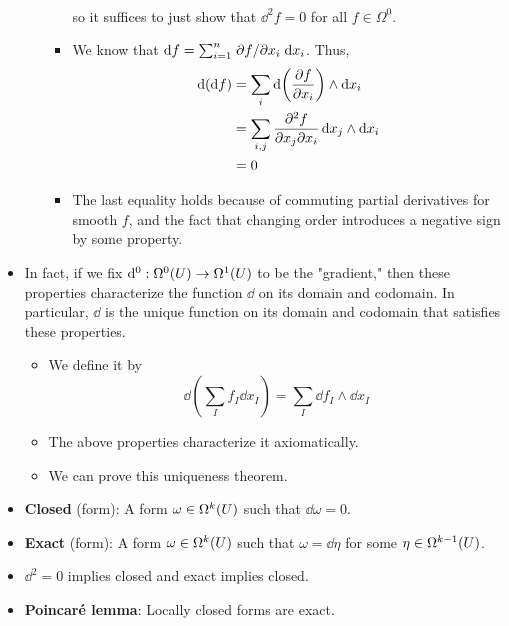 \documentclass[../notes.tex]{subfiles}
\begin{document}
\begin{itemize}
\begin{enumerate}
\begin{itemize}
\begin{align*}
            \end{align*}
            so it suffices to just show that $\dd^2f=0$ for all $f\in\Omega^0$.
            \item We know that $\dd{f}=\sum_{i=1}^n\pdv*{f}{x_i}\dd{x_i}$. Thus,
            \begin{align*}
                \dd(\dd{f}) &= \sum_i\dd(\pdv{f}{x_i})\wedge\dd{x_i}\\
                &= \sum_{i,j}\pdv{f}{x_j}{x_i}\dd{x_j}\wedge\dd{x_i}\\
                &= 0
            \end{align*}
            \item The last equality holds because of commuting partial derivatives for smooth $f$, and the fact that changing order introduces a negative sign by some property.
        \end{itemize}
    \end{enumerate}
    \item In fact, if we fix $\dd^0:\ome[0]{U}\to\ome[1]{U}$ to be the "gradient," then these properties characterize the function $\dd$ on its domain and codomain. In particular, $\dd$ is the unique function on its domain and codomain that satisfies these properties.
    \begin{itemize}
        \item We define it by
        \begin{equation*}
            \dd{\left( \sum_If_I\dd{x_I} \right)} = \sum_I\dd{f_I}\wedge\dd{x_I}
        \end{equation*}
        \item The above properties characterize it axiomatically.
        \item We can prove this uniqueness theorem.
    \end{itemize}
    \item \textbf{Closed} (form): A form $\omega\in\ome[k]{U}$ such that $\dd{\omega}=0$.
    \item \textbf{Exact} (form): A form $\omega\in\ome[k]{U}$ such that $\omega=\dd{\eta}$ for some $\eta\in\ome[k-1]{U}$.
    \item $\dd^2=0$ implies closed and exact implies closed.
    \item \textbf{Poincar\'{e} lemma}: Locally closed forms are exact.
\end{itemize}
\end{document}
